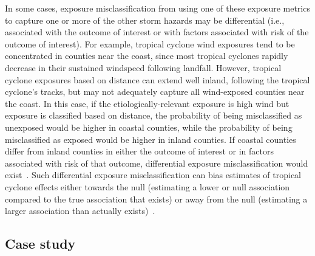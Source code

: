 In some cases, exposure misclassification from using one of these exposure
metrics to capture one or more of the other storm hazards may be differential
(i.e., associated with the outcome of interest or with factors associated with
risk of the outcome of interest). For example, tropical cyclone wind exposures
tend to be concentrated in counties near the coast, since most tropical
cyclones rapidly decrease in their sustained windspeed following landfall.
However, tropical cyclone exposures based on distance can extend well inland,
following the tropical cyclone's tracks, but may not adequately capture all
wind-exposed counties near the coast. In this case, if the
etiologically-relevant exposure is high wind but exposure is classified based
on distance, the probability of being misclassified as unexposed would be
higher in coastal counties, while the probability of being misclassified as
exposed would be higher in inland counties. If coastal counties differ from
inland counties in either the outcome of interest or in factors associated with
risk of that outcome, differential exposure misclassification would
exist~\parencite{savitz2016interpreting}. Such differential exposure
misclassification can bias estimates of tropical cyclone effects either towards
the null (estimating a lower or null association compared to the true
association that exists) or away from the null (estimating a larger association
than actually exists)~\parencite{savitz2016interpreting, armstrong1998effect}.

\begin{comment}
The use of a single hazard-based metric (e.g., wind) could cause similar
problems if the impact is driven, at least in part, by a different hazard or by
multiple hazards of the tropical cyclone.
\end{comment}

\subsection*{Case study}


